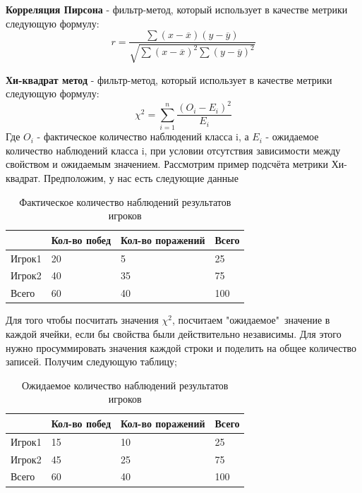\textbf{Корреляция Пирсона} - фильтр-метод, который использует в качестве метрики следующую формулу:
\begin{equation}
\label{pearson}
r=\frac{\sum(x - \overline{x})(y - \overline{y})}{\sqrt{\sum(x - \overline{x})^2\sum(y - \overline{y})^2}}
\end{equation}

\textbf{Хи-квадрат метод} - фильтр-метод, который использует в качестве метрики следующую формулу:
\begin{equation}
\label{chi2}
\chi^2=\sum_{i=1}^n\frac{(O_i - E_i)^2}{E_i}
\end{equation}
Где $O_i$ - фактическое количество наблюдений класса i, а $E_i$ - ожидаемое количество наблюдений класса i, при условии отсутствия зависимости между свойством и ожидаемым значением.
Рассмотрим пример подсчёта метрики Хи-квадрат.
Предположим, у нас есть следующие данные
\begin{table}[!h]
	
	\caption{\label{tab:table1}Фактическое количество наблюдений результатов игроков}
	
	\begin{center}
\begin{tabular}{|l|l|l|l|}

\hline

  & Кол-во побед & Кол-во поражений & Всего \\
\hline
Игрок1  & 20 & 5 & 25 \\
\hline
Игрок2  & 40 & 35 & 75 \\
\hline
Всего  & 60 & 40 & 100 \\
\hline

\end{tabular}
		
\end{center}

\end{table}

Для того чтобы посчитать значения $\chi^2$, посчитаем "ожидаемое"\ значение в каждой ячейки, если бы свойства были действительно независимы. Для этого нужно просуммировать значения каждой строки и поделить на общее количество записей.
Получим следующую таблицу;
\begin{table}[!h]
	
	\caption{\label{tab:table2}Ожидаемое количество наблюдений результатов игроков}
	
	\begin{center}
\begin{tabular}{|l|l|l|l|}

\hline

  & Кол-во побед & Кол-во поражений & Всего \\
\hline
Игрок1  & 15 & 10 & 25 \\
\hline
Игрок2  & 45 & 25 & 75 \\
\hline
Всего  & 60 & 40 & 100 \\
\hline

\end{tabular}
		
\end{center}

\end{table}

